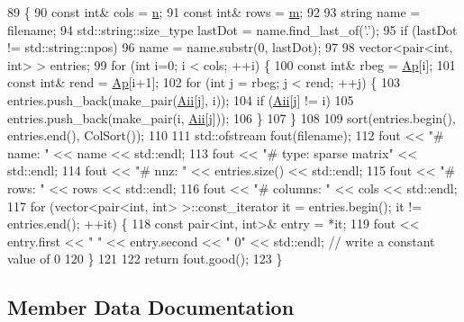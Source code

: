 \begin{DoxyCode}
89 \{
90   \textcolor{keyword}{const} \textcolor{keywordtype}{int}& cols = \hyperlink{classg2o_1_1MatrixStructure_aa91f296406c17ab3a826d03bf75cfea7}{n};
91   \textcolor{keyword}{const} \textcolor{keywordtype}{int}& rows = \hyperlink{classg2o_1_1MatrixStructure_a9cceed2097dcbaa27ed88b7005440616}{m};
92 
93   \textcolor{keywordtype}{string} name = filename;
94   std::string::size\_type lastDot = name.find\_last\_of(\textcolor{charliteral}{'.'});
95   \textcolor{keywordflow}{if} (lastDot != std::string::npos) 
96     name = name.substr(0, lastDot);
97 
98   vector<pair<int, int> > entries;
99   \textcolor{keywordflow}{for} (\textcolor{keywordtype}{int} i=0; i < cols; ++i) \{
100     \textcolor{keyword}{const} \textcolor{keywordtype}{int}& rbeg = \hyperlink{classg2o_1_1MatrixStructure_aeeff8e78fb766a433aecbfda4a2e3ffc}{Ap}[i];
101     \textcolor{keyword}{const} \textcolor{keywordtype}{int}& rend = \hyperlink{classg2o_1_1MatrixStructure_aeeff8e78fb766a433aecbfda4a2e3ffc}{Ap}[i+1];
102     \textcolor{keywordflow}{for} (\textcolor{keywordtype}{int} j = rbeg; j < rend; ++j) \{
103       entries.push\_back(make\_pair(\hyperlink{classg2o_1_1MatrixStructure_a7984bf429b8694070ab8db5f5852d8bb}{Aii}[j], i));
104       \textcolor{keywordflow}{if} (\hyperlink{classg2o_1_1MatrixStructure_a7984bf429b8694070ab8db5f5852d8bb}{Aii}[j] != i)
105         entries.push\_back(make\_pair(i, \hyperlink{classg2o_1_1MatrixStructure_a7984bf429b8694070ab8db5f5852d8bb}{Aii}[j]));
106     \}
107   \}
108 
109   sort(entries.begin(), entries.end(), ColSort());
110 
111   std::ofstream fout(filename);
112   fout << \textcolor{stringliteral}{"# name: "} << name << std::endl;
113   fout << \textcolor{stringliteral}{"# type: sparse matrix"} << std::endl;
114   fout << \textcolor{stringliteral}{"# nnz: "} << entries.size() << std::endl;
115   fout << \textcolor{stringliteral}{"# rows: "} << rows << std::endl;
116   fout << \textcolor{stringliteral}{"# columns: "} << cols << std::endl;
117   \textcolor{keywordflow}{for} (vector<pair<int, int> >::const\_iterator it = entries.begin(); it != entries.end(); ++it) \{
118     \textcolor{keyword}{const} pair<int, int>& entry = *it;
119     fout << entry.first << \textcolor{stringliteral}{" "} << entry.second << \textcolor{stringliteral}{" 0"} << std::endl; \textcolor{comment}{// write a constant value of 0}
120   \}
121 
122   \textcolor{keywordflow}{return} fout.good();
123 \}
\end{DoxyCode}


\subsection{Member Data Documentation}
